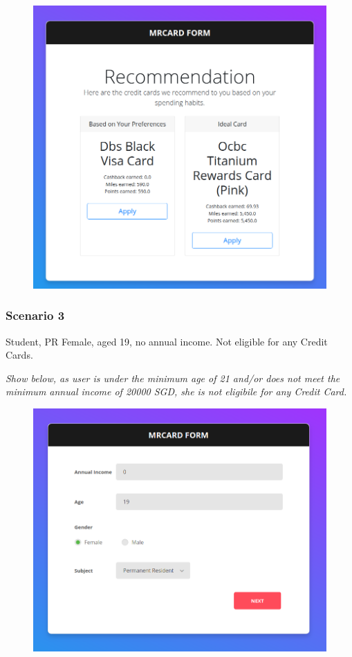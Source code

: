 		\begin{figure}[H]
			\centering
			\includegraphics[width=\linewidth]{img/scenario2_recommendation.png}
		\end{figure}

	\subsubsection{Scenario 3} %
	\label{ssub:scenario_3}
		Student, PR Female, aged 19, no annual income. Not eligible for any Credit Cards.

		\textit{Show below, as user is under the minimum age of 21 and/or does not meet the minimum annual income of 20000 SGD, she is not eligibile for any Credit Card.}

		\begin{figure}[H]
			\centering
			\includegraphics[width=\linewidth]{img/scenario3_eligibility.png}
		\end{figure}

